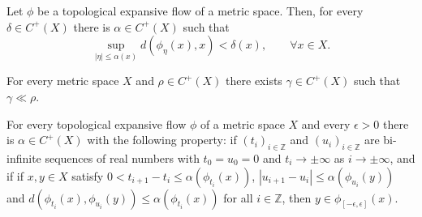 \documentclass[10pt,a4paper]{amsart}
\begin{document}
\begin{lemma}
\label{mcoy}
Let $\phi$ be a topological expansive flow of a metric space.
Then, for every $\delta\in C^+(X)$ there is $\alpha\in C^+(X)$ such that
\begin{equation}
\label{sistema}
\sup_{|\eta|\leq \alpha(x)}d(\phi_\eta(x),x)< \delta(x),\quad\quad\forall x\in X.
\end{equation}
\end{lemma}

\begin{lemma}
\label{power}
For every metric space $X$ and $\rho\in C^+(X)$ there exists $\gamma\in C^+(X)$ such that $\gamma\ll\rho$.
\end{lemma}

\begin{lemma}
\label{p1}
For every topological expansive flow $\phi$ of a metric space $X$
and every $\epsilon>0$ there is $\alpha\in C^+(X)$ with the following property:
if $(t_i)_{i\in\mathbb{Z}}$ and $(u_i)_{i\in\mathbb{Z}}$ are bi-infinite sequences of real numbers with $t_0=u_0=0$ and $t_i\to\pm\infty$ as $i\to\pm\infty$, and if
if $x,y\in X$ satisfy
$0<t_{i+1}-t_i\leq\alpha(\phi_{t_i}(x))$, $|u_{i+1}-u_i|\leq\alpha(\phi_{u_i}(y))$ and 
$d(\phi_{t_i}(x),\phi_{u_i}(y))\leq\alpha(\phi_{t_i}(x))$ for all $i\in\mathbb{Z}$,
then $y\in \phi_{[-\epsilon,\epsilon]}(x)$.
\end{lemma}
\end{document}
